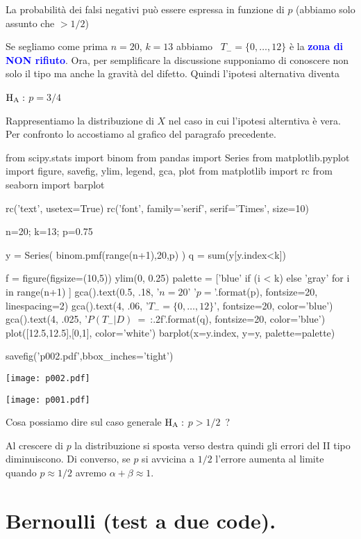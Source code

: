 \documentclass[10pt,openany]{book}
\def\HA{{\rm H_A}}
\def\emph#1{\textcolor{blue}{\textbf{\boldmath #1}}}
\theoremstyle{mio}
\theoremstyle{liscio}
\begin{document}
La probabilità dei falsi negativi può essere espressa in funzione di $p$ (abbiamo solo assunto che $>1/2$)



Se segliamo come prima $n=20$, $k=13$ abbiamo {\color{blue}\boldmath\ $T_-=\{0,\dots,12\}$} è la \emph{zona di NON rifiuto}.
Ora, per semplificare la discussione supponiamo di conoscere non solo il tipo ma anche la gravità del difetto. Quindi l'ipotesi alternativa diventa

$\HA:$ $p=3/4$

Rappresentiamo la distribuzione di $X$ nel caso in cui l'ipotesi alterntiva è vera. Per confronto lo accostiamo al grafico del paragrafo precedente. 


\begin{pycode}
from scipy.stats import binom
from pandas import Series
from matplotlib.pyplot import figure, savefig, ylim, legend, gca, plot
from matplotlib import rc
from seaborn import barplot

rc('text', usetex=True)
rc('font', family='serif', serif='Times', size=10)


n=20; k=13; p=0.75

y = Series( binom.pmf(range(n+1),20,p) )
q = sum(y[y.index<k])

f = figure(figsize=(10,5))
ylim(0, 0.25)
palette = ['blue' if (i < k) else 'gray' for i in range(n+1) ]
gca().text(0.5, .18, '$n=20$\n' '$p={}$'.format(p), fontsize=20, linespacing=2)
gca().text(4, .06, '$T_-=\{0,\dots,12\}$', fontsize=20, color='blue')
gca().text(4, .025, '$P(T_-|D)$\ =\ {:.2f}'.format(q), fontsize=20, color='blue')
plot([12.5,12.5],[0,1], color='white')
barplot(x=y.index, y=y, palette=palette)

savefig('p002.pdf',bbox_inches='tight')
\end{pycode}
\hfil\texttt{[image: p002.pdf]}

\hfil\texttt{[image: p001.pdf]}

Cosa possiamo dire sul caso generale $\HA:$ $p>1/2$~?

Al crescere di $p$ la distribuzione si sposta verso destra quindi gli errori del II tipo diminuiscono. Di converso, se $p$ si avvicina a $1/2$ l'errore aumenta al limite quando $p\approx 1/2$ avremo $\alpha+\beta\approx 1$.  


\clearpage\section{Bernoulli (test a due code).}
\end{document}
